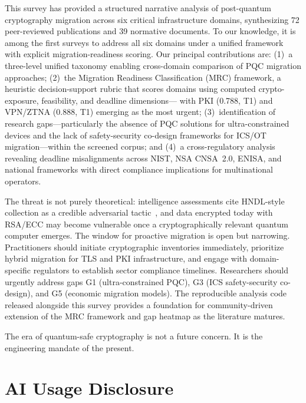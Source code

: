 \documentclass[journal]{IEEEtran}
\begin{document}
This survey has provided a structured narrative analysis of post-quantum
cryptography migration across six critical infrastructure domains, synthesizing
72 peer-reviewed publications and 39 normative documents.
To our knowledge, it is among the first surveys to address all six domains under
a unified framework with explicit migration-readiness scoring.
Our principal contributions are: (1)~a three-level unified taxonomy enabling
cross-domain comparison of PQC migration approaches; (2)~the Migration Readiness
Classification (MRC) framework, a heuristic decision-support rubric that scores
domains using computed crypto-exposure, feasibility, and deadline dimensions---
with PKI (0.788, T1) and VPN/ZTNA (0.888, T1) emerging as the most urgent;
(3)~identification of research gaps---particularly the absence of PQC solutions for
ultra-constrained devices and the lack of safety-security co-design frameworks
for ICS/OT migration---within the screened corpus; and (4)~a cross-regulatory
analysis revealing deadline misalignments across NIST, NSA CNSA~2.0, ENISA, and
national frameworks with direct compliance implications for multinational operators.

The threat is not purely theoretical: intelligence assessments cite HNDL-style
collection as a credible adversarial tactic~\cite{odni2023atr}, and data
encrypted today with RSA/ECC may become vulnerable once a cryptographically
relevant quantum computer emerges. The window for proactive migration is open
but narrowing. Practitioners should initiate cryptographic inventories immediately,
prioritize hybrid migration for TLS and PKI infrastructure, and engage with
domain-specific regulators to establish sector compliance timelines. Researchers
should urgently address gaps G1 (ultra-constrained PQC), G3 (ICS safety-security
co-design), and G5 (economic migration models). The reproducible analysis code
released alongside this survey provides a foundation for community-driven
extension of the MRC framework and gap heatmap as the literature matures.

The era of quantum-safe cryptography is not a future concern. It is the
engineering mandate of the present.

\section*{AI Usage Disclosure}
\end{document}

